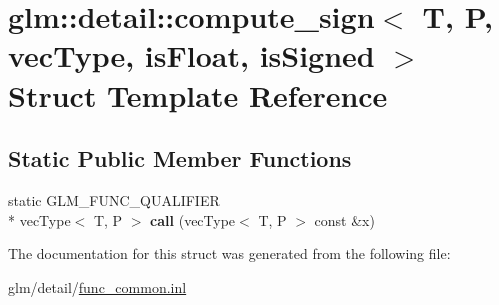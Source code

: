 \hypertarget{structglm_1_1detail_1_1compute__sign}{\section{glm\-:\-:detail\-:\-:compute\-\_\-sign$<$ T, P, vec\-Type, is\-Float, is\-Signed $>$ Struct Template Reference}
\label{structglm_1_1detail_1_1compute__sign}
}
\subsection*{Static Public Member Functions}
\begin{DoxyCompactItemize}
\item 
\hypertarget{structglm_1_1detail_1_1compute__sign_aa7efec90c8354b6b019f200bb44ceba3}{static G\-L\-M\-\_\-\-F\-U\-N\-C\-\_\-\-Q\-U\-A\-L\-I\-F\-I\-E\-R \\*
vec\-Type$<$ T, P $>$ {\bfseries call} (vec\-Type$<$ T, P $>$ const \&x)}\label{structglm_1_1detail_1_1compute__sign_aa7efec90c8354b6b019f200bb44ceba3}

\end{DoxyCompactItemize}


The documentation for this struct was generated from the following file\-:\begin{DoxyCompactItemize}
\item 
glm/detail/\hyperlink{func__common_8inl}{func\-\_\-common.\-inl}\end{DoxyCompactItemize}
